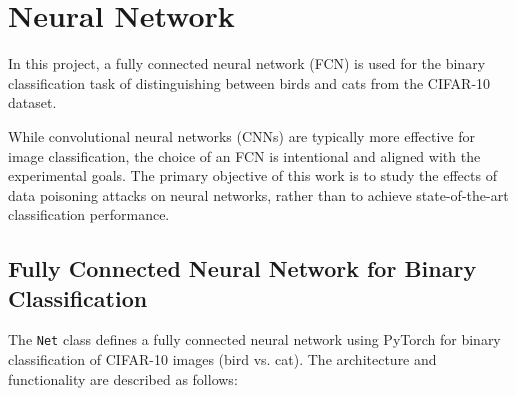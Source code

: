 \section{Neural Network}

In this project, a fully connected neural network (FCN) is used for the binary classification task of distinguishing between birds and cats from the CIFAR-10 dataset.

While convolutional neural networks (CNNs) are typically more effective for image classification, the choice of an FCN is intentional and aligned with the experimental goals. The primary objective of this work is to study the effects of data poisoning attacks on neural networks, rather than to achieve state-of-the-art classification performance.

\subsection{Fully Connected Neural Network for Binary Classification}

The \texttt{Net} class defines a fully connected neural network using PyTorch for binary classification of CIFAR-10 images (bird vs. cat). The architecture and functionality are described as follows:


